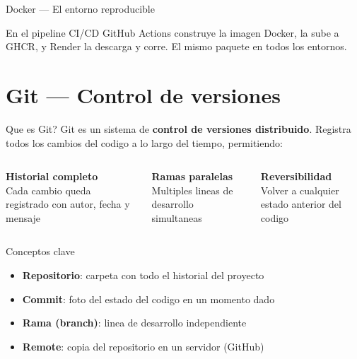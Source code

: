 \documentclass[aspectratio=169]{beamer}
\begin{document}
\begin{frame}{Docker --- El entorno reproducible}
  \vspace{0.3cm}
  \begin{alertblock}{En el pipeline CI/CD}
    GitHub Actions construye la imagen Docker, la sube a GHCR,
    y Render la descarga y corre. El mismo paquete en todos los entornos.
  \end{alertblock}
\end{frame}
\section{Git --- Control de versiones}

\begin{frame}{Que es Git?}
  Git es un sistema de \textbf{control de versiones distribuido}. Registra todos los cambios del codigo a lo largo del tiempo, permitiendo:

  \vspace{0.4cm}
  \begin{columns}
    \begin{center}
      \textbf{Historial completo}\\[0.2cm]
      {\small Cada cambio queda registrado con autor, fecha y mensaje}
    \end{center}

    \begin{center}
      \textbf{Ramas paralelas}\\[0.2cm]
      {\small Multiples lineas de desarrollo simultaneas}
    \end{center}

    \begin{center}
      \textbf{Reversibilidad}\\[0.2cm]
      {\small Volver a cualquier estado anterior del codigo}
    \end{center}
  \end{columns}

  \vspace{0.4cm}
  \begin{block}{Conceptos clave}
    \begin{itemize}
      \item \textbf{Repositorio}: carpeta con todo el historial del proyecto
      \item \textbf{Commit}: foto del estado del codigo en un momento dado
      \item \textbf{Rama (branch)}: linea de desarrollo independiente
      \item \textbf{Remote}: copia del repositorio en un servidor (GitHub)
    \end{itemize}
  \end{block}
\end{frame}
\end{document}

